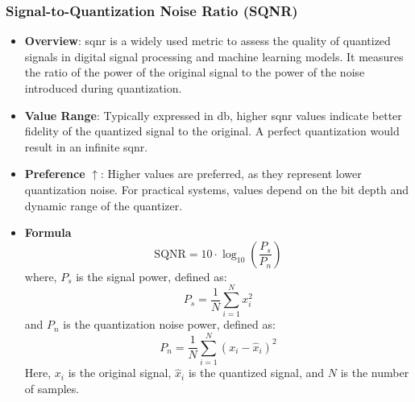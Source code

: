        \subsubsection{Signal-to-Quantization Noise Ratio (SQNR)}
        \label{subsubsec:SQNR}
        \begin{itemize}
            \item \textbf{Overview}: \gls{sqnr} is a widely used metric to assess the quality of quantized signals in digital signal processing and machine learning models. It measures the ratio of the power of the original signal to the power of the noise introduced during quantization.
            \item \textbf{Value Range}: Typically expressed in \gls{db}, higher \gls{sqnr} values indicate better fidelity of the quantized signal to the original. A perfect quantization would result in an infinite \gls{sqnr}.
            \item \textbf{Preference} $\uparrow$: Higher values are preferred, as they represent lower quantization noise. For practical systems, values depend on the bit depth and dynamic range of the quantizer.
            \item \textbf{Formula}
            \begin{equation}\label{eqn:SQNR}
                \text{SQNR} = 10 \cdot \log_{10}\left(\frac{P_s}{P_n}\right)
            \end{equation}
            where, \(P_s\) is the signal power, defined as:
            \begin{equation}
                P_s = \frac{1}{N} \sum_{i=1}^N x_i^2
            \end{equation}
            and \(P_n\) is the quantization noise power, defined as:
            \begin{equation}
                P_n = \frac{1}{N} \sum_{i=1}^N (x_i - \hat{x}_i)^2
            \end{equation}
            Here, \(x_i\) is the original signal, \(\hat{x}_i\) is the quantized signal, and \(N\) is the number of samples.
        \end{itemize}
               
           
